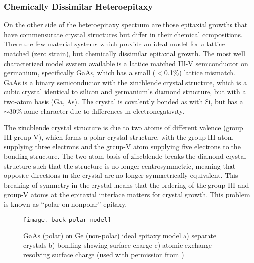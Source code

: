 \subsubsection{Chemically Dissimilar Heteroepitaxy} On the other side of the heteroepitaxy spectrum are those epitaxial growths that have commensurate crystal structures but differ in their chemical compositions.
There are few material systems which provide an ideal model for a lattice matched (zero strain), but chemically dissimilar epitaxial growth.
The most well characterized model system available is a lattice matched III-V semiconductor on germanium, specifically GaAs, which has a small (\(<\)0.1\%) lattice mismatch.
GaAs is a binary semiconductor with the zincblende crystal structure, which is a cubic crystal identical to silicon and germanium's diamond structure, but with a two-atom basis (Ga, As).
The crystal is covalently bonded as with Si, but has a \(\sim\)30\% ionic character due to differences in electronegativity\cite{Christensen1987}.

The zincblende crystal structure is due to two atoms of different valence (group III-group V), which forms a polar crystal structure, with the group-III atom supplying three electrons and the group-V atom supplying five electrons to the bonding structure.
The two-atom basis of zincblende breaks the diamond crystal structure such that the structure is no longer centrosymmetric, meaning that opposite directions in the crystal are no longer symmetrically equivalent.
This breaking of symmetry in the crystal means that the ordering of the group-III and group-V atoms at the epitaxial interface matters for crystal growth.
This problem is known as ``polar-on-nonpolar'' epitaxy\cite{Biegelsen1992,Kroemer1987}.
\begin{figure}
 \centering \texttt{[image: back\_polar\_model]}
 \caption[Atomic model of polar on non-polar epitaxy]{\label{fig:back_polar_model}GaAs (polar) on Ge (non-polar) ideal epitaxy model a) separate crystals b) bonding showing surface charge c) atomic exchange resolving surface charge (used with permission from \cite{Biegelsen1992}).}
\end{figure}

